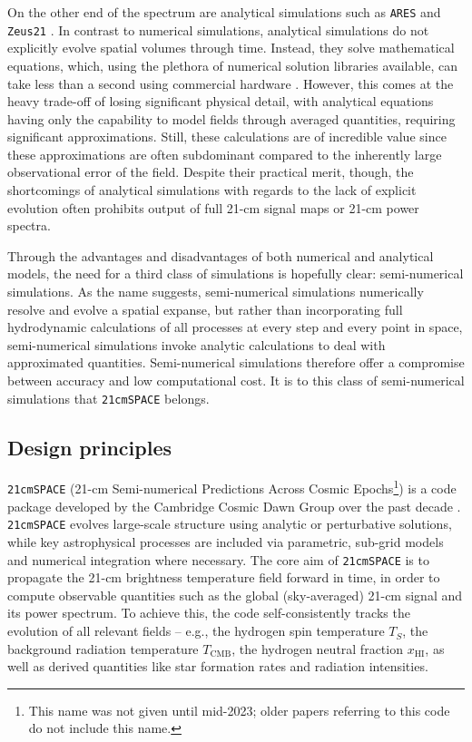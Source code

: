 \documentclass[floats,floatfix,showpacs,amssymb,prd,superscriptaddress,nofootinbib]{revtex4-2} %
\newcommand{\code}{\texttt}
\begin{document}
On the other end of the spectrum are analytical simulations such as \code{ARES} \citep{Mirocha_2014} and \code{Zeus21} \citep{Munoz_2023}. In contrast to numerical simulations, analytical simulations do not explicitly evolve spatial volumes through time. Instead, they solve mathematical equations, which, using the plethora of numerical solution libraries available, can take less than a second using commercial hardware \citep{gessey-jones_thesis}. However, this comes at the heavy trade-off of losing significant physical detail, with analytical equations having only the capability to model fields through averaged quantities, requiring significant approximations. Still, these calculations are of incredible value since these approximations are often subdominant compared to the inherently large observational error of the field. Despite their practical merit, though, the shortcomings of analytical simulations with regards to the lack of explicit evolution often prohibits output of full 21-cm signal maps or 21-cm power spectra.

Through the advantages and disadvantages of both numerical and analytical models, the need for a third class of simulations is hopefully clear: semi-numerical simulations. As the name suggests, semi-numerical simulations numerically resolve and evolve a spatial expanse, but rather than incorporating full hydrodynamic calculations of all processes at every step and every point in space, semi-numerical simulations invoke analytic calculations to deal with approximated quantities. Semi-numerical simulations therefore offer a compromise between accuracy and low computational cost. It is to this class of semi-numerical simulations that \code{21cmSPACE} belongs.


\subsection{Design principles}
\code{21cmSPACE} (21-cm Semi-numerical Predictions Across Cosmic Epochs\footnote{This name was not given until mid-2023; older papers referring to this code do not include this name.}) is a code package developed by the Cambridge Cosmic Dawn Group over the past decade \citep{Fialkov_2012, Visbal_2012}. \code{21cmSPACE} evolves large-scale structure using analytic or perturbative solutions, while key astrophysical processes are included via parametric, sub-grid models and numerical integration where necessary. The core aim of \code{21cmSPACE} is to propagate the 21-cm brightness temperature field forward in time, in order to compute observable quantities such as the global (sky-averaged) 21-cm signal and its power spectrum. To achieve this, the code self-consistently tracks the evolution of all relevant fields -- e.g., the hydrogen spin temperature $T_S$, the background radiation temperature $T_{\text{CMB}}$, the hydrogen neutral fraction $x_{\text{HI}}$, as well as derived quantities like star formation rates and radiation intensities.
\end{document}
